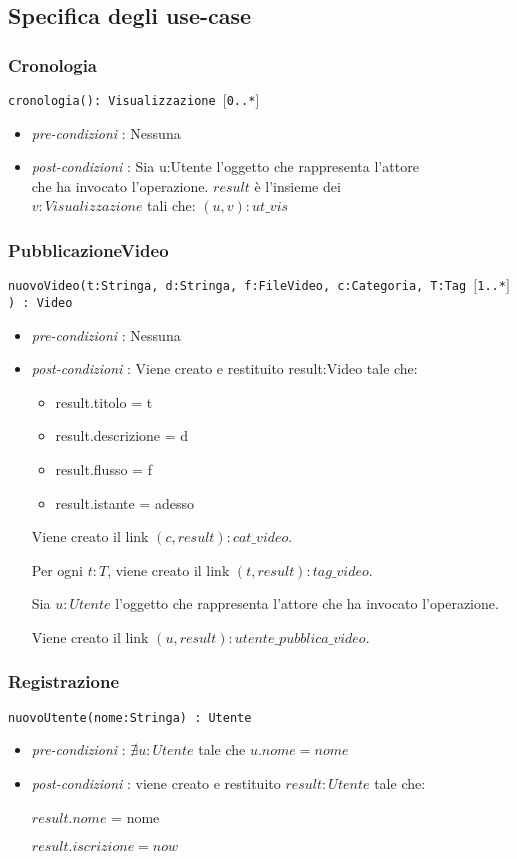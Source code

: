 \documentclass[12pt, letterpaper]{article}
\newcommand{\code}[1]{\colorbox{light-gray}{\texttt{#1}}}
\begin{document}
\subsection{Specifica degli use-case}
\subsubsection{Cronologia}
\code{cronologia(): Visualizzazione $[$0..*$]$ }\begin{itemize}
    \item \textit{pre-condizioni} : Nessuna
    \item \textit{post-condizioni} : Sia u:Utente l'oggetto che rappresenta l'attore\\ che ha 
    invocato l'operazione.
    $result$ è l'insieme dei\\ $v:Visualizzazione$ tali che:
        $(u,v):ut\_vis$
\end{itemize}
\subsubsection{PubblicazioneVideo}
\code{nuovoVideo(t:Stringa, d:Stringa, f:FileVideo, c:Categoria, T:Tag $[$1..*$]$) : Video }\begin{itemize}
    \item \textit{pre-condizioni} : Nessuna
    \item \textit{post-condizioni} :  
    Viene creato e restituito result:Video tale che:\begin{itemize}
        \item  result.titolo = t
        \item  result.descrizione = d
        \item  result.flusso = f
        \item  result.istante = adesso
\end{itemize}
Viene creato il link $(c, result): cat\_video$.

Per ogni $t:T$, viene creato il link $(t,result): tag\_video$.

Sia $u:Utente$ l'oggetto che rappresenta l'attore che ha 
invocato l'operazione.

Viene creato il link $(u,result): utente\_pubblica\_video$.
\end{itemize}
\subsubsection{Registrazione}
\code{nuovoUtente(nome:Stringa) : Utente}\begin{itemize}
    \item \textit{pre-condizioni} : $\nexists u:Utente$ tale che $u.nome = nome$
    \item \textit{post-condizioni} :  
    viene creato e restituito $result:Utente$ tale che:

				$result.nome$ = nome

				$result.iscrizione=now$ 
\end{itemize}
\end{document}
